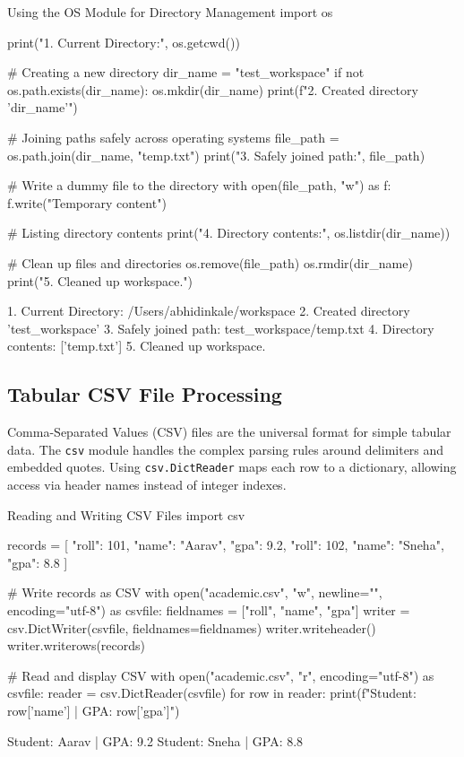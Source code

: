 \begin{pythoncode}{Using the OS Module for Directory Management}
import os

print("1. Current Directory:", os.getcwd())

# Creating a new directory
dir_name = "test_workspace"
if not os.path.exists(dir_name):
    os.mkdir(dir_name)
    print(f"2. Created directory '{dir_name}'")

# Joining paths safely across operating systems
file_path = os.path.join(dir_name, "temp.txt")
print("3. Safely joined path:", file_path)

# Write a dummy file to the directory
with open(file_path, "w") as f:
    f.write("Temporary content")

# Listing directory contents
print("4. Directory contents:", os.listdir(dir_name))

# Clean up files and directories
os.remove(file_path)
os.rmdir(dir_name)
print("5. Cleaned up workspace.")
\end{pythoncode}
\begin{outputbox}
1. Current Directory: /Users/abhidinkale/workspace
2. Created directory 'test_workspace'
3. Safely joined path: test_workspace/temp.txt
4. Directory contents: ['temp.txt']
5. Cleaned up workspace.
\end{outputbox}

\subsection{Tabular CSV File Processing}

Comma-Separated Values (CSV) files are the universal format for simple tabular data. The \texttt{csv} module handles the complex parsing rules around delimiters and embedded quotes. Using \texttt{csv.DictReader} maps each row to a dictionary, allowing access via header names instead of integer indexes.

\begin{pythoncode}{Reading and Writing CSV Files}
import csv

records = [
    {"roll": 101, "name": "Aarav", "gpa": 9.2},
    {"roll": 102, "name": "Sneha", "gpa": 8.8}
]

# Write records as CSV
with open("academic.csv", "w", newline="", encoding="utf-8") as csvfile:
    fieldnames = ["roll", "name", "gpa"]
    writer = csv.DictWriter(csvfile, fieldnames=fieldnames)
    writer.writeheader()
    writer.writerows(records)

# Read and display CSV
with open("academic.csv", "r", encoding="utf-8") as csvfile:
    reader = csv.DictReader(csvfile)
    for row in reader:
        print(f"Student: {row['name']} | GPA: {row['gpa']}")
\end{pythoncode}
\begin{outputbox}
Student: Aarav | GPA: 9.2
Student: Sneha | GPA: 8.8
\end{outputbox}

